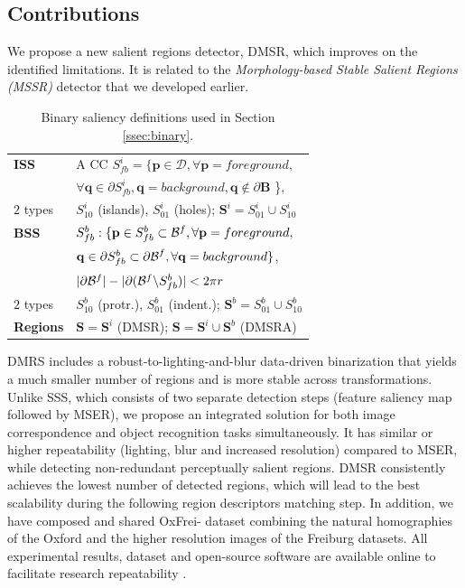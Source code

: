 \documentclass[conference,compsoc]{IEEEtran}
\def\B{{\mathbf B}}
\def\mcD{{\mathcal{D}}}
\def\p{{\mathbf p}}
\def\q{{\mathbf q}}
\def\S{{\mathbf S}}
\begin{document}
\subsection{Contributions}
We propose a new salient regions detector, DMSR, which improves on the identified limitations. It is related to the {\em Morphology-based Stable Salient Regions (MSSR)} detector that we developed earlier\cite{RangMSSR06, RangHumpb06}. 
\begin{table}[hbt]
\caption{Binary saliency definitions used in Section \ref{ssec:binary}.}\label{table:binary_sal}
\begin{minipage}[b]{0.99\linewidth}\begin{tabular}{|l l|}
\hline
{\bf ISS} & A CC $S^i_{fb} = \{\p \in \mcD, \forall \p=foreground,$\\&$\forall \q \in \partial S^i_{fb}, \q=background, \q \notin \partial \B $ \},\\
$2$ types & $S^i_{10}$ (islands), $S^i_{01}$  (holes); $\S^i = S_{01}^i \cup S_{10}^i$\\
{\bf BSS} &  $S_{fb}^b: \{\p \in S_{fb}^b \subset{\cal B}^f, \forall \p = foreground,$\\&$ \q \in \partial S_{fb}^b \subset {\partial \cal B}^f,\forall \q = background \}$, \\
& $|\partial {\cal B}^f| - |\partial ({\cal B}^f \backslash S_{fb}^b)| < 2 \pi r$\\
$2$ types & $S^b_{10}$ (protr.), $S^b_{01}$ (indent.); $\S^b = S_{01}^b \cup S_{10}^b$\\
{\bf Regions} &  $\S = \S^i$ (DMSR); $\S = \S^i \cup \S^b$ (DMSRA)  \\
\hline
\end{tabular}
\centering
\end{minipage}
\end{table}


DMRS includes a robust-to-lighting-and-blur data-driven binarization that yields a much smaller number of regions and is more stable across transformations. Unlike SSS, which consists of two separate detection steps (feature saliency map followed by MSER), we propose an integrated solution for both image correspondence and object recognition tasks simultaneously. It has similar or higher  repeatability (lighting, blur and increased resolution) compared to MSER, while detecting non-redundant perceptually salient regions. DMSR consistently achieves the lowest number of detected regions, which will lead to the best scalability during the following region descriptors matching step.  In addition, we have composed and shared OxFrei- dataset combining the natural homographies of the Oxford and the higher resolution images of the Freiburg datasets. All experimental results, dataset and open-source software are available online to facilitate research repeatability \cite{elena_ranguelova_2016_45156}. 
\end{document}
